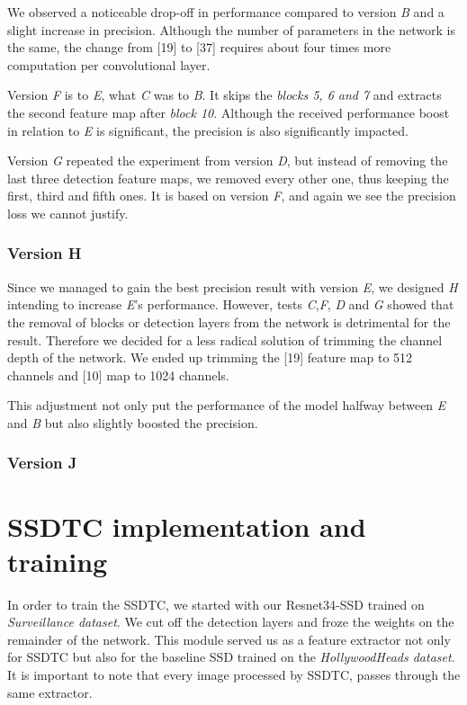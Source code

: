 We observed a noticeable drop-off in performance compared to version \textit{B} and a slight increase in precision. Although the number of parameters in the network is the same, the change from [19] to [37] requires about four times more computation per convolutional layer.

Version \textit{F} is to \textit{E}, what \textit{C} was to \textit{B}. It skips the \textit{blocks 5, 6 and 7} and extracts the second feature map after \textit{block 10}. Although the received performance boost in relation to \textit{E} is significant, the precision is also significantly impacted.

Version \textit{G} repeated the experiment from version \textit{D}, but instead of removing the last three detection feature maps, we removed every other one, thus keeping the first, third and fifth ones. It is based on version \textit{F}, and again we see the precision loss we cannot justify.

\subsubsection{Version H}
Since we managed to gain the best precision result with version \textit{E}, we designed \textit{H} intending to increase \textit{E}'s performance. However, tests \textit{C},\textit{F}, \textit{D} and \textit{G} showed that the removal of blocks or detection layers from the network is detrimental for the result. Therefore we decided for a less radical solution of trimming the channel depth of the network. We ended up trimming the [19] feature map to 512 channels and [10] map to 1024 channels.

This adjustment not only put the performance of the model halfway between \textit{E} and \textit{B} but also slightly boosted the precision.

\subsubsection{Version J}

\section{SSDTC implementation and training}
\label{sec:ssdtcImpl}
In order to train the SSDTC, we started with our Resnet34-SSD trained on \textit{Surveillance dataset}. We cut off the detection layers and froze the weights on the remainder of the network. This module served us as a feature extractor not only for SSDTC but also for the baseline SSD trained on the \textit{HollywoodHeads dataset}. It is important to note that every image processed by SSDTC, passes through the same extractor. 

